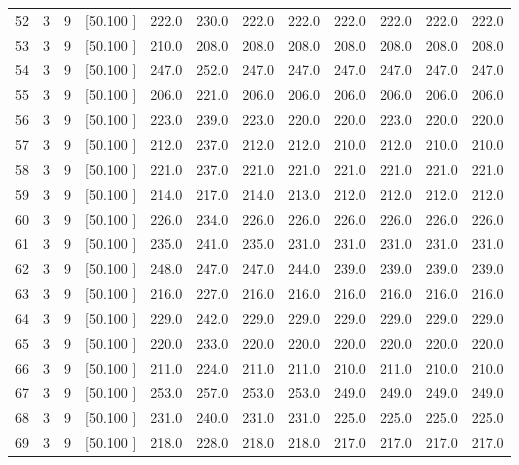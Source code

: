 \documentclass[12pt,a4paper]{article}
\begin{document}
\begin{center}
{\begin{tabular}{r r r r r r r r r r r r}
  52&  3&  9&[50.100    ]&   222.0&   230.0&   222.0&   222.0&   222.0&   222.0&   222.0&   222.0\\[-0.02in]
  53&  3&  9&[50.100    ]&   210.0&   208.0&   208.0&   208.0&   208.0&   208.0&   208.0&   208.0\\[-0.02in]
  54&  3&  9&[50.100    ]&   247.0&   252.0&   247.0&   247.0&   247.0&   247.0&   247.0&   247.0\\[-0.02in]
  55&  3&  9&[50.100    ]&   206.0&   221.0&   206.0&   206.0&   206.0&   206.0&   206.0&   206.0\\[-0.02in]
  56&  3&  9&[50.100    ]&   223.0&   239.0&   223.0&   220.0&   220.0&   223.0&   220.0&   220.0\\[-0.02in]
  57&  3&  9&[50.100    ]&   212.0&   237.0&   212.0&   212.0&   210.0&   212.0&   210.0&   210.0\\[-0.02in]
  58&  3&  9&[50.100    ]&   221.0&   237.0&   221.0&   221.0&   221.0&   221.0&   221.0&   221.0\\[-0.02in]
  59&  3&  9&[50.100    ]&   214.0&   217.0&   214.0&   213.0&   212.0&   212.0&   212.0&   212.0\\[-0.02in]
  60&  3&  9&[50.100    ]&   226.0&   234.0&   226.0&   226.0&   226.0&   226.0&   226.0&   226.0\\[-0.02in]
  61&  3&  9&[50.100    ]&   235.0&   241.0&   235.0&   231.0&   231.0&   231.0&   231.0&   231.0\\[-0.02in]
  62&  3&  9&[50.100    ]&   248.0&   247.0&   247.0&   244.0&   239.0&   239.0&   239.0&   239.0\\[-0.02in]
  63&  3&  9&[50.100    ]&   216.0&   227.0&   216.0&   216.0&   216.0&   216.0&   216.0&   216.0\\[-0.02in]
  64&  3&  9&[50.100    ]&   229.0&   242.0&   229.0&   229.0&   229.0&   229.0&   229.0&   229.0\\[-0.02in]
  65&  3&  9&[50.100    ]&   220.0&   233.0&   220.0&   220.0&   220.0&   220.0&   220.0&   220.0\\[-0.02in]
  66&  3&  9&[50.100    ]&   211.0&   224.0&   211.0&   211.0&   210.0&   211.0&   210.0&   210.0\\[-0.02in]
  67&  3&  9&[50.100    ]&   253.0&   257.0&   253.0&   253.0&   249.0&   249.0&   249.0&   249.0\\[-0.02in]
  68&  3&  9&[50.100    ]&   231.0&   240.0&   231.0&   231.0&   225.0&   225.0&   225.0&   225.0\\[-0.02in]
  69&  3&  9&[50.100    ]&   218.0&   228.0&   218.0&   218.0&   217.0&   217.0&   217.0&   217.0\\[-0.02in]

\end{tabular}}
\end{center}
\end{document}

